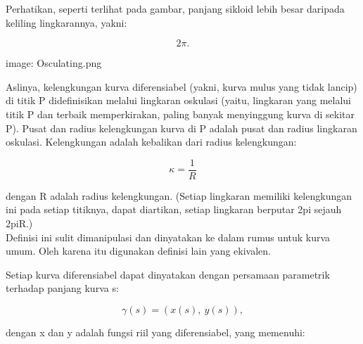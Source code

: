 \documentclass[a4paper,10pt]{article}
\begin{document}
\begin{eulernotebook}
\begin{eulercomment}
\begin{eulercomment}
\begin{eulercomment}
\begin{eulercomment}
\begin{eulercomment}
\begin{eulercomment}
\begin{eulercomment}
\begin{eulercomment}
\begin{eulercomment}
\begin{eulercomment}
\begin{eulercomment}
\begin{eulercomment}
\begin{eulercomment}
\begin{eulercomment}
\begin{eulercomment}
\begin{eulercomment}
\begin{eulercomment}
\begin{eulercomment}
\begin{eulercomment}
\begin{eulercomment}
\begin{eulercomment}
\begin{eulercomment}
\begin{eulercomment}
Perhatikan, seperti terlihat pada gambar, panjang sikloid lebih besar daripada keliling lingkarannya, yakni:

\end{eulercomment}
\begin{eulerformula}
\[
2\pi.
\]
\end{eulerformula}
\begin{eulercomment}
image: Osculating.png

Aslinya, kelengkungan kurva diferensiabel (yakni, kurva mulus yang
tidak lancip) di titik P didefinisikan melalui lingkaran oskulasi
(yaitu, lingkaran yang melalui titik P dan terbaik memperkirakan,
paling banyak menyinggung kurva di sekitar P). Pusat dan radius
kelengkungan kurva di P adalah pusat dan radius lingkaran oskulasi.
Kelengkungan adalah kebalikan dari radius kelengkungan:

\end{eulercomment}
\begin{eulerformula}
\[
\kappa =\frac {1}{R}
\]
\end{eulerformula}
\begin{eulercomment}
dengan R adalah radius kelengkungan. (Setiap lingkaran memiliki
kelengkungan ini pada setiap titiknya, dapat diartikan, setiap
lingkaran berputar 2pi sejauh 2piR.)\\
Definisi ini sulit dimanipulasi dan dinyatakan ke dalam rumus untuk
kurva umum. Oleh karena itu digunakan definisi lain yang ekivalen.

\end{eulercomment}
\begin{eulercomment}
Setiap kurva diferensiabel dapat dinyatakan dengan persamaan
parametrik terhadap panjang kurva s:

\end{eulercomment}
\begin{eulerformula}
\[
\gamma(s) = (x(s),\ y(s)),
\]
\end{eulerformula}
\begin{eulercomment}
dengan x dan y adalah fungsi riil yang diferensiabel, yang memenuhi:


\end{eulercomment}
\end{eulercomment}
\end{eulercomment}
\end{eulercomment}
\end{eulercomment}
\end{eulercomment}
\end{eulercomment}
\end{eulercomment}
\end{eulercomment}
\end{eulercomment}
\end{eulercomment}
\end{eulercomment}
\end{eulercomment}
\end{eulercomment}
\end{eulercomment}
\end{eulercomment}
\end{eulercomment}
\end{eulercomment}
\end{eulercomment}
\end{eulercomment}
\end{eulercomment}
\end{eulercomment}
\end{eulercomment}
\end{eulernotebook}
\end{document}
